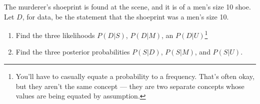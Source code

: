 \documentclass[a4paper, 12pt]{article}
\begin{document}
The murderer's shoeprint is found at the scene, and it is
of a men's size 10 shoe. Let $D$, for data, be the statement that the
shoeprint was a men's size 10.

\begin{enumerate}
\item Find the three likelihoods
$P(D|S)$, $P(D|M)$, an $P(D|U)$\footnote{You'll have to casually equate
a probability to a frequency. That's often okay, but they aren't the
same concept --- they are two separate concepts whose values are being
equated by assumption.}
\item Find the three posterior probabilities $P(S|D)$, $P(S|M)$,
and $P(S|U)$.
\end{enumerate}
\end{document}
